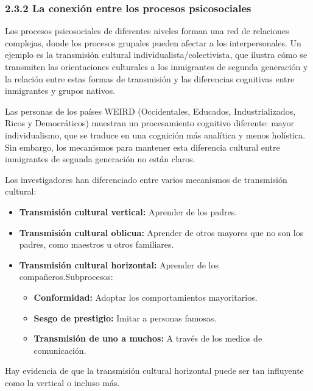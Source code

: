 \documentclass[
]{website}
\providecommand{\tightlist}{%
  \setlength{\itemsep}{0pt}\setlength{\parskip}{0pt}}
\begin{document}
\subsubsection*{2.3.2 La conexión entre los procesos psicosociales}\label{subtema2_3_2}

Los procesos psicosociales de diferentes niveles forman una red de relaciones complejas, donde los procesos grupales pueden afectar a los interpersonales. Un ejemplo es la transmisión cultural individualista/colectivista, que ilustra cómo se transmiten las orientaciones culturales a los inmigrantes de segunda generación y la relación entre estas formas de transmisión y las diferencias cognitivas entre inmigrantes y grupos nativos.

Las personas de los países WEIRD (Occidentales, Educados, Industrializados, Ricos y Democráticos) muestran un procesamiento cognitivo diferente: mayor individualismo, que se traduce en una cognición más analítica y menos holística. Sin embargo, los mecanismos para mantener esta diferencia cultural entre inmigrantes de segunda generación no están claros.

Los investigadores han diferenciado entre varios mecanismos de transmisión cultural:

\begin{itemize}
\tightlist
\item
  \textbf{Transmisión cultural vertical:} Aprender de los padres.
\item
  \textbf{Transmisión cultural oblicua:} Aprender de otros mayores que no son los padres, como maestros u otros familiares.
\item
  \textbf{Transmisión cultural horizontal:} Aprender de los compañeros.Subprocesos:

  \begin{itemize}
  \tightlist
  \item
    \textbf{Conformidad:} Adoptar los comportamientos mayoritarios.
  \item
    \textbf{Sesgo de prestigio:} Imitar a personas famosas.
  \item
    \textbf{Transmisión de uno a muchos:} A través de los medios de comunicación.
  \end{itemize}
\end{itemize}

Hay evidencia de que la transmisión cultural horizontal puede ser tan influyente como la vertical o incluso más.
\end{document}
